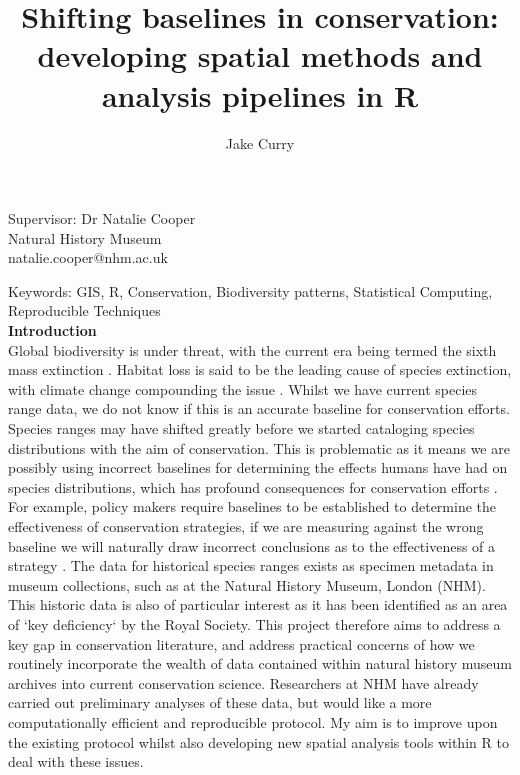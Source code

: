 \documentclass[11pt,onehalfspacing]{article}
\begin{document}
\begin{titlepage}
			
			\title{%
				Shifting baselines in conservation: developing spatial methods and analysis pipelines in R
				}
			
			\author{Jake Curry}
			
			\maketitle
			\begin{center}
				\large Supervisor: Dr Natalie Cooper \\Natural History Museum \\ natalie.cooper@nhm.ac.uk
			\end{center}
			
\end{titlepage}
Keywords: GIS, R, Conservation, Biodiversity patterns, Statistical Computing, Reproducible Techniques \\

\textbf{Introduction} \\
Global biodiversity is under threat, with the current era being termed the sixth mass extinction  \cite{Barnosky2011}. Habitat loss is said to be the leading cause of species extinction\cite{Brooks2002}, with climate change compounding the issue \cite{Thomas2004}. Whilst we have current species range data, we do not know if this is an accurate baseline for conservation efforts. Species ranges may have shifted greatly before we started cataloging species distributions with the aim of conservation. This is problematic as it means we are possibly using incorrect baselines for determining the effects humans have had on species distributions, which has profound consequences for conservation efforts \cite{Froyd2008}. For example, policy makers require baselines to be established to determine the effectiveness of conservation strategies, if we are measuring against the wrong baseline we will naturally draw incorrect conclusions as to the effectiveness of a strategy \cite{Willis2005}\cite{ Willis2006}. The data for historical species ranges exists as specimen metadata in museum collections, such as at the Natural History Museum, London (NHM).  
This historic data is also of particular interest as it has been identified as an area of `key deficiency` by the Royal Society\cite{RoyalSocietyWorkingParty2003}. This project therefore aims to address a key gap in conservation literature, and address practical concerns of how we routinely incorporate the wealth of data contained within natural history museum archives into current conservation science. 
Researchers at NHM have already carried out preliminary analyses of these data, but would like a more computationally efficient and reproducible protocol. My aim is to improve upon the existing protocol whilst also developing new spatial analysis tools within R to deal with these issues. \\
\end{document}
